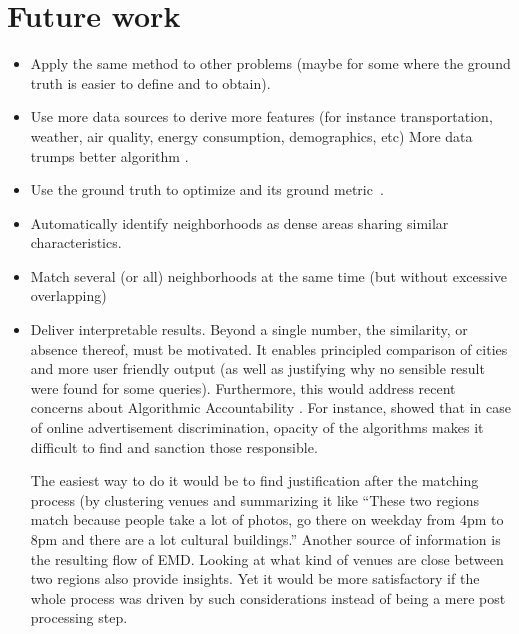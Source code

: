 \section{Future work}
\begin{itemize}
	\item Apply the same method to other problems (maybe for some where the ground truth is easier to define and to obtain).
	\item Use more data sources to derive more features (for instance
		transportation, weather, air quality, energy consumption, demographics,
		etc) More data trumps better algorithm \autocite{MoreData09}.
	\item Use the ground truth to optimize \emd{} and its ground		metric~\cite{LearnEMD14}.
	\item Automatically identify neighborhoods as dense areas sharing similar characteristics.
        \item Match several (or all) neighborhoods at the same time (but without excessive overlapping)
	\item Deliver interpretable results. Beyond a single number, the
		similarity, or absence thereof, must be motivated. It enables
		principled comparison of cities and more user friendly output (as well
		as justifying why no sensible result were found for some queries).
		Furthermore, this would address recent concerns about Algorithmic
		Accountability \autocite{Accountability13}. For instance,
		\textcite{Discrimination13} showed that in case of online advertisement
		discrimination, opacity of the algorithms makes it difficult to find
		and sanction those responsible.

		The easiest way to do it would be to find justification after the
		matching process (by clustering venues and summarizing it like
		\enquote{These two regions match because people take a lot of photos,
		go there on weekday from 4pm to 8pm and there are a lot cultural
		buildings.} Another source of information is the resulting flow of
		EMD. Looking at what kind of venues are close between two regions also
		provide insights. Yet it would be more satisfactory if the whole
		process was driven by such considerations instead of being a mere post
		processing step.
\end{itemize}


